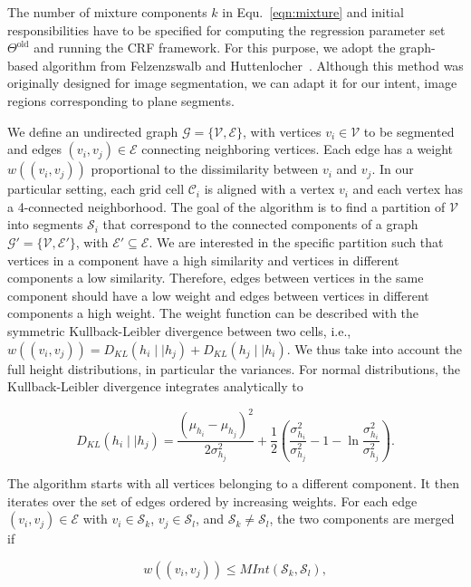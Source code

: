 The number of mixture components $k$ in Equ.~\eqref{eqn:mixture} and initial
responsibilities have to be specified for computing the regression parameter set
$\Theta^\text{old}$ and running the CRF framework. For this purpose, we adopt
the graph-based algorithm from Felzenzswalb and
Huttenlocher~\cite{felzenszwalb04efficient}. Although this method was originally
designed for image segmentation, we can adapt it for our intent, image regions
corresponding to plane segments.

We define an undirected graph $\mathcal{G}=\{\mathcal{V},\mathcal{E}\}$, with
vertices $v_i\in\mathcal{V}$ to be segmented and edges $(v_i,v_j)\in\mathcal{E}$
connecting neighboring vertices. Each edge has a weight $w((v_i,v_j))$
proportional to the dissimilarity between $v_i$ and $v_j$. In our particular
setting, each grid cell $\mathcal{C}_i$ is aligned with a vertex $v_i$ and each
vertex has a 4-connected neighborhood. The goal of the algorithm is to find a
partition of $\mathcal{V}$ into segments $\mathcal{S}_i$ that correspond to the
connected components of a graph $\mathcal{G}'=\{\mathcal{V},\mathcal{E}'\}$,
with $\mathcal{E}'\subseteq\mathcal{E}$. We are interested in the specific
partition such that vertices in a component have a high similarity and vertices
in different components a low similarity. Therefore, edges between vertices in
the same component should have a low weight and edges between vertices in
different components a high weight. The weight function can be described with
the symmetric Kullback-Leibler divergence between two cells, i.e.,
$w((v_i,v_j))=D_{KL}(h_i\mid\mid h_j)+D_{KL}(h_j\mid\mid h_i)$. We thus take
into account the full height distributions, in particular the variances. For
normal distributions, the Kullback-Leibler divergence integrates analytically to

\begin{equation}
\label{eqn:kl}
D_{KL}(h_i\mid\mid h_j)=\frac{(\mu_{h_i}-\mu_{h_j})^2}{2\sigma_{h_j}^2}+
\frac{1}{2}(\frac{\sigma_{h_i}^2}{\sigma_{h_j}^2}-1-\ln\frac{\sigma_{h_i}^2}
{\sigma_{h_j}^2}).
\end{equation}

The algorithm starts with all vertices belonging to a different component. It
then iterates over the set of edges ordered by increasing weights. For each
edge $(v_i,v_j)\in\mathcal{E}$ with $v_i\in\mathcal{S}_k$,
$v_j\in\mathcal{S}_l$, and $\mathcal{S}_k\neq\mathcal{S}_l$, the two components
are merged if

\begin{equation}
\label{eqn:merge}
w((v_i,v_j))\leq MInt(\mathcal{S}_k, \mathcal{S}_l),
\end{equation}


